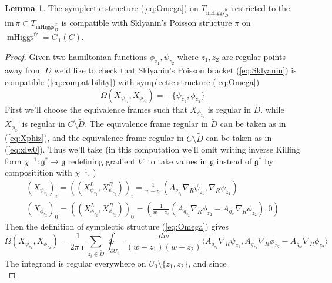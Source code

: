 \documentclass[11pt, oneside, reqno]{amsart}
\theoremstyle{definition} \newtheorem{definition}{Definition}[section]
\newtheorem{lemma}[definition]{Lemma}
\theoremstyle{definition} \newtheorem{remark}[definition]{Remark}
\theoremstyle{definition} \newtheorem{remarks}[definition]{Remarks}
\theoremstyle{definition} \newtheorem{question}[definition]{Question}
\theoremstyle{definition} \newtheorem*{note}{Note}
\theoremstyle{definition} \newtheorem{example}[definition]{Example}
\theoremstyle{definition} \newtheorem{examples}[definition]{Examples}
\renewcommand{\gg}{\mathfrak{g}}
\DeclareMathOperator{\mhiggs}{mHiggs}
\newcommand{\fr}{\mathrm{fr}}
\begin{document}
\begin{lemma}\label{lemma:OmegaPi}
  The symplectic structure (\ref{eq:Omega}) on $T_{\mhiggs^{\fr}_{D}}$ 
restricted to the $\mathrm{im} \, \pi \subset T_{\mhiggs^{\fr}_{D}}$  is compatible
  with Sklyanin's Poisson structure $\pi$ on $\mhiggs^{\fr} = G_1(C)$.
\end{lemma}
\begin{proof}
  Given two hamiltonian functions $\phi_{z_1}, \psi_{z_2}$ where $z_1, z_2$ are regular
  points away from $\tilde D$ we'd like to check
  that Sklyanin's Poisson bracket (\ref{eq:Sklyanin})  
is compatible (\ref{eq:compatibility}) with symplectic structure (\ref{eq:Omega})
\begin{equation}
  \Omega(X_{\psi_{z_1}}, X_{\phi_{z_2}})  = - \{\psi_{z_1}, \phi_{z_2}\}
\end{equation}
First we'll choose the equivalence frames such that $X_{\psi_{z_1}}$ is regular in $\tilde D$. 
while $X_{\phi_{z_2}}$ is regular in $C \setminus \tilde D$.
The equivalence frame regular in $\tilde D$ can be taken as in  (\ref{eq:Xphiz}),
and the equivalence frame regular in $C \setminus \tilde D$ can be taken
as in (\ref{eq:xlw0}). Thus we'll take (in this computation we'll omit writing inverse
Killing form $\chi^{-1}: \gg^{*} \to \gg $ redefining gradient $\nabla$ to take values in $\gg$ instead of $\gg^{*}$
by compositition with $\chi^{-1}$. )
\begin{equation}
  \begin{aligned}
    (X_{\psi_{z_1}})_{i} = ((X_{\psi_{z_2}}^{L}, X_{\psi_{z_2}}^{R}))_{i} =  \frac{1}{w - z_1} (A_{g_{z_1}} \nabla_R \psi_{z_1},   \nabla_{R} \psi_{z_1}) \\
    (X_{\phi_{z_2}})_{0} = ((X_{\phi_{z_2}}^{L}, X_{\phi_{z_2}}^{R}))_{0} = ( \frac{1}{w - z_2} ( A_{g_{z_2}} \nabla_R \phi_{z_2} - A_{g_{w}} \nabla_{R} \phi_{z_2}), 0) 
  \end{aligned}
\end{equation}
Then the definition of symplectic structure (\ref{eq:Omega}) gives
\begin{equation}
  \label{eq:pairing}
  \Omega(X_{\psi_{z_1}}, X_{\phi_{z_2}}) = \frac{1}{2 \pi \imath }
  \sum_{z_i \in \tilde D} \oint_{\partial U_i} \frac{dw }{(w - z_1)(w - z_2)} \langle A_{g_{z_1}} \nabla_{R} \psi_{z_1},
  A_{g_{z_2}} \nabla_{R} \phi_{z_2}  - A_{g_w} \nabla_{R} \phi_{z_2} \rangle
\end{equation}
The integrand is regular everywhere on $U_0 \setminus \{z_1, z_2\}$, and since
\begin{equation}

\end{equation}
\end{proof}
\end{document}
